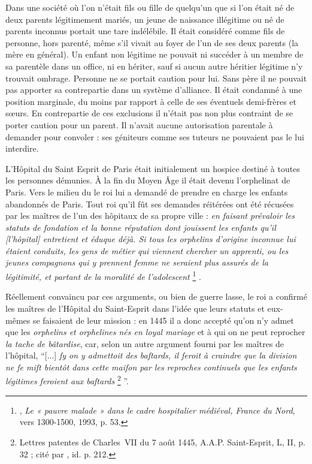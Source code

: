  Dans une société où l'on n'était fils ou fille de quelqu'un que si l'on était né de deux parents légitimement mariés, un jeune de naissance illégitime ou né de parents inconnus portait une tare indélébile. Il était considéré comme fils de personne, hors parenté, même s'il vivait au foyer de l'un de ses deux parents (la mère en général). Un enfant non légitime ne pouvait ni succéder à un membre de sa parentèle dans un office, ni en hériter, sauf si aucun autre héritier légitime n'y trouvait ombrage. Personne ne se portait caution pour lui. Sans père il ne pouvait pas apporter sa contrepartie dans un système d'alliance. Il était condamné à une position marginale, du moins par rapport à celle de ses éventuels demi-frères et sœurs. En contrepartie de ces exclusions il n'était pas non plus contraint de se porter caution pour un parent. Il n'avait aucune autorisation parentale à demander pour convoler : ses géniteurs comme ses tuteurs ne pouvaient pas le lui interdire.

 L'Hôpital du Saint Esprit de Paris était initialement un hospice destiné à toutes les personnes démunies. À la fin du Moyen Âge il était devenu l'orphelinat de Paris. Vers le milieu du  le roi lui a demandé de prendre en charge les enfants abandonnés de Paris. Tout roi qu'il fût ses demandes réitérées ont été récusées par les maîtres de l'un des hôpitaux de sa propre ville : \emph{en faisant prévaloir les statuts de fondation et la bonne réputation dont jouissent les enfants qu'il \emph{[l'hôpital]} entretient et éduque déjà. Si tous les orphelins d'origine inconnue lui étaient conduits, les gens de métier qui viennent chercher un apprenti, ou les jeunes compagnons qui y prennent femme ne seraient plus assurés de la légitimité, et partant de la moralité de l'adolescent}%
\footnote{, \emph{Le « pauvre malade » dans le cadre hospitalier médiéval, France du Nord}, vers 1300-1500, 1993, p. 53.}%
.

 Réellement convaincu par ces arguments, ou bien de guerre lasse, le roi a confirmé les maîtres de l'Hôpital du Saint-Esprit dans l'idée que leurs statuts et eux-mêmes se faisaient de leur mission : en 1445 il a donc accepté qu'on n'y admet que les \emph{orphelins et orphelines nés en loyal mariage} et à qui on ne peut reprocher \emph{la tache de bâtardise}, car, selon un autre argument fourni par les maîtres de l'hôpital, \enquote{[...] \emph{ſy on y admettoit des baſtards, il ſeroit à craindre que la division ne ſe miſt bientôt dans cette maiſon par les reproches continuels que les enfants légitimes feroient aux baſtards}%
\footnote{Lettres patentes de Charles~VII du 7 août 1445, A.A.P. Saint-Esprit, L, II, p. 32 ; cité par , id. p. 212.}%
}.

